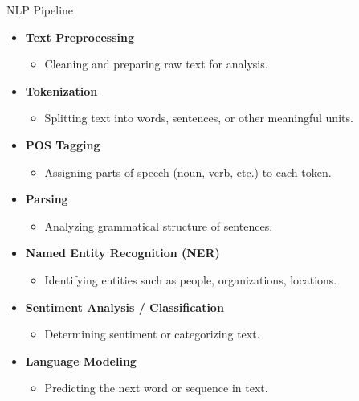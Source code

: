 \begin{frame}[allowframebreaks]{NLP Pipeline}
    \begin{itemize}
        \item \textbf{Text Preprocessing}
        \vspace{-0.5em}
        \begin{itemize}
            \item Cleaning and preparing raw text for analysis.
        \end{itemize}
        \item \textbf{Tokenization}
        \vspace{-0.5em}
        \begin{itemize}
            \item Splitting text into words, sentences, or other meaningful units.
        \end{itemize}
        \item \textbf{POS Tagging}
        \vspace{-0.5em}
        \begin{itemize}
            
            \item Assigning parts of speech (noun, verb, etc.) to each token.
        \end{itemize}
        \item \textbf{Parsing}
        \vspace{-0.5em}
        \begin{itemize}
            
            \item Analyzing grammatical structure of sentences.
        \end{itemize}
        \item \textbf{Named Entity Recognition (NER)}
        \vspace{-0.5em}
        \begin{itemize}
            
            \item Identifying entities such as people, organizations, locations.
        \end{itemize}
        \item \textbf{Sentiment Analysis / Classification}
        \vspace{-0.5em}
        \begin{itemize}
            
            \item Determining sentiment or categorizing text.
        \end{itemize}
        \item \textbf{Language Modeling}
        \vspace{-0.5em}
        \begin{itemize}

            \item Predicting the next word or sequence in text.
        \end{itemize}
    \end{itemize}
\end{frame}

